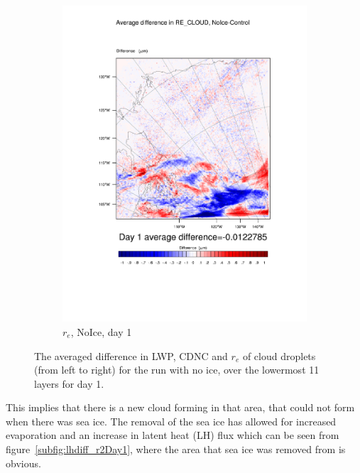 \begin{figure}[hb]
\begin{subfigure}{0.30\textwidth}
		\includegraphics[width=\textwidth]{results/noice/diff_NoIce_RE_CLOUD_Day1.pdf}
		\caption{$r_e$, NoIce, day 1}
		\label{subfig:recloud_r2Day1}
	\end{subfigure}
\caption{The averaged difference in LWP, CDNC and $r_e$ of cloud droplets (from left to right) for the run with no ice, over the lowermost 11 layers for day 1.}
\label{fig:lwpcdncre_r2Day1}
\end{figure}
This implies that there is a new cloud forming in that area, that could not form when there was sea ice. The removal of the sea ice has allowed for increased evaporation and an increase in latent heat (LH) flux which can be seen from figure~\ref{subfig:lhdiff_r2Day1}, where the area that sea ice was removed from is obvious.
